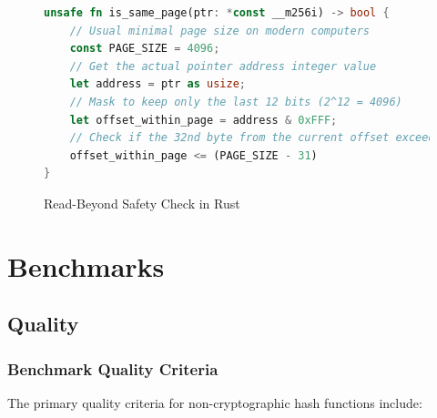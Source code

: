\documentclass[10pt]{article}
\begin{document}
\begin{figure}[H]
\begin{lstlisting}[language=Rust, style=boxed]
unsafe fn is_same_page(ptr: *const __m256i) -> bool {
    // Usual minimal page size on modern computers
    const PAGE_SIZE = 4096;
    // Get the actual pointer address integer value
    let address = ptr as usize;
    // Mask to keep only the last 12 bits (2^12 = 4096)
    let offset_within_page = address & 0xFFF;
    // Check if the 32nd byte from the current offset exceeds the page boundary
    offset_within_page <= (PAGE_SIZE - 31)
}
\end{lstlisting}
\caption{Read-Beyond Safety Check in Rust}
\label{fig:check_page_example}
\end{figure}

\clearpage
\section{Benchmarks}

\subsection{Quality}

\subsubsection{Benchmark Quality Criteria}
The primary quality criteria for non-cryptographic hash functions include:
\end{document}
